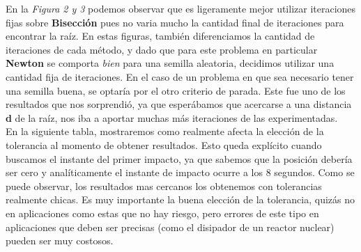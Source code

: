 \documentclass[a4paper]{article}
\begin{document}
En la \textit{Figura 2 y 3} podemos observar que es ligeramente mejor utilizar iteraciones fijas sobre \textbf{Bisección} pues no varia mucho la cantidad final de iteraciones para encontrar la raíz. En estas figuras, también diferenciamos la cantidad de iteraciones de cada método, y dado que para este problema en particular \textbf{Newton} se comporta \textit{bien} para una semilla aleatoria, decidimos utilizar una cantidad fija de iteraciones.
En el caso de un problema en que sea necesario tener una semilla buena, se optaría por el otro criterio de parada.
Este fue uno de los resultados que nos sorprendió, ya que esperábamos que acercarse a una distancia \textbf{d} de la raíz, nos iba a aportar muchas más iteraciones de las experimentadas.\\


En la siguiente tabla, mostraremos como realmente afecta la elección de la tolerancia al momento de obtener resultados. Esto queda explícito cuando buscamos el instante del primer impacto, ya que sabemos que la posición debería ser cero y analíticamente el instante de impacto ocurre a los 8 segundos. Como se puede observar, los resultados mas cercanos los obtenemos con tolerancias realmente chicas.
Es muy importante la buena elección de la tolerancia, quizás no en aplicaciones como estas que no hay riesgo, pero errores de este tipo en aplicaciones que deben ser precisas (como el disipador de un reactor nuclear) pueden ser muy costosos.
\end{document}
